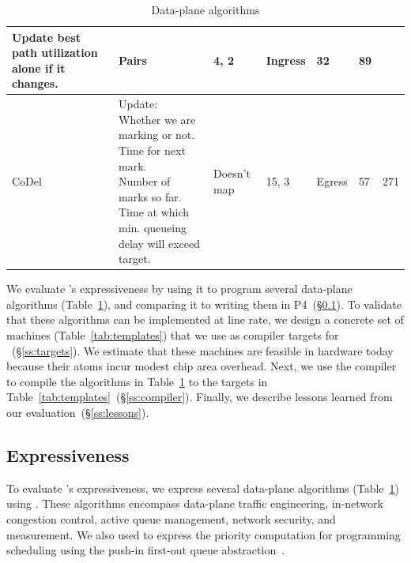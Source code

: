 \begin{table}[!t]
\begin{tabular}{|p{}|p{}|p{}|p{}|p{}|p{}|p{}|}
{                                           Update best path utilization alone if it changes.}  & Pairs & 4, 2 & Ingress & 32 & 89\\
\hline
CoDel~\cite{codel} & \pbox{0.34\textwidth}{Update:\\Whether we are marking or not.\\Time for next mark.\\Number of marks so far.\\Time at which min. queueing delay will exceed target.}& Doesn't map & 15, 3 & Egress & 57 & 271\\
\hline
\end{tabular}
\caption{Data-plane algorithms}
\label{tab:algos}
\end{table}

We evaluate \pktlanguage's expressiveness by using it to program several
data-plane algorithms (Table~\ref{tab:algos}), and comparing it to writing them
in P4~(\S\ref{ss:expressiveness}).  To validate that these algorithms can be
implemented at line rate, we design a concrete set of \absmachine machines
(Table~\ref{tab:templates}) that we use as compiler targets for
\pktlanguage~(\S\ref{ss:targets}).  We estimate that these machines are
feasible in hardware today because their atoms incur modest chip area overhead.
Next, we use the \pktlanguage compiler to compile the algorithms in
Table~\ref{tab:algos} to the targets in Table~\ref{tab:templates}~(\S\ref{ss:compiler}).  Finally, we
describe lessons learned from our evaluation~(\S\ref{ss:lessons}).

\subsection{Expressiveness}
\label{ss:expressiveness}

To evaluate \pktlanguage's expressiveness, we express several data-plane
algorithms (Table~\ref{tab:algos}) using \pktlanguage. These algorithms
encompass data-plane traffic engineering, in-network congestion control, active
queue management, network security, and measurement. We also used \pktlanguage
to express the priority computation for programming scheduling using the
push-in first-out queue abstraction~\cite{pifo_hotnets}.

